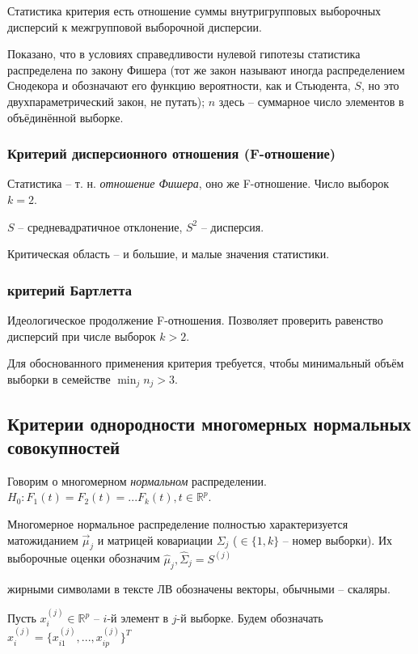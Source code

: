 \documentclass[main.tex]{subfiles}
\begin{document}
Статистика критерия есть отношение суммы внутригрупповых выборочных дисперсий к межгрупповой выборочной дисперсии.

Показано, что в условиях справедливости нулевой гипотезы статистика распределена по закону Фишера (тот же закон называют иногда распределением Снодекора и обозначают его функцию вероятности, как и Стьюдента, $S$, но это двухпараметрический закон, не путать); $n$ здесь -- суммарное число элементов в объёдинённой выборке.

\subsubsection{Критерий дисперсионного отношения (F-отношение)}

Статистика -- т. н. \emph{отношение Фишера}, оно же F-отношение. Число выборок $ k = 2 $.

$ S $ -- средневадратичное отклонение, $ S^2 $ -- дисперсия.

Критическая область -- и большие, и малые значения статистики.

\subsubsection{критерий Бартлетта}

Идеологическое продолжение F-отношения. Позволяет проверить равенство дисперсий при числе выборок $ k > 2 $.

Для обоснованного применения критерия требуется, чтобы минимальный объём выборки в семействе $ \min_j n_j > 3 $.

\subsection{Критерии однородности многомерных нормальных совокупностей}

Говорим о многомерном \emph{нормальном} распределении. $ H_0: F_1(t)=F_2(t)=...F_k(t), t \in \mathds{R}^p $.

Многомерное нормальное распределение полностью характеризуется матожиданием $\vec \mu_j$ и матрицей ковариации $ \Sigma_j $ ($ \in \{1,k\}$ -- номер выборки). Их выборочные оценки обозначим $ \hat \mu_j, \hat \Sigma_j = S^{(j)} $

\begin{leftbar}
	жирными символами в тексте ЛВ обозначены векторы, обычными -- скаляры.
\end{leftbar}

Пусть $ x_i^{(j)} \in \mathds{R}^p $ -- $ i $-й элемент в $ j $-й выборке. Будем обозначать $ x_i^{(j)} = \{x_{i1}^{(j)}, ..., x_{ip}^{(j)}\}^T $
\end{document}
